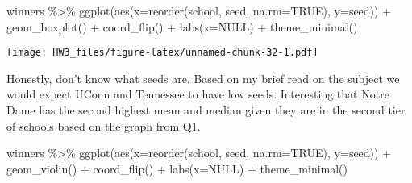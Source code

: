 \documentclass[
]{article}
\newenvironment{Shaded}{\begin{snugshade}}{\end{snugshade}}
\newcommand{\AttributeTok}[1]{\textcolor[rgb]{0.77,0.63,0.00}{#1}}
\newcommand{\ConstantTok}[1]{\textcolor[rgb]{0.00,0.00,0.00}{#1}}
\newcommand{\FunctionTok}[1]{\textcolor[rgb]{0.00,0.00,0.00}{#1}}
\newcommand{\NormalTok}[1]{#1}
\newcommand{\OtherTok}[1]{\textcolor[rgb]{0.56,0.35,0.01}{#1}}
\newcommand{\SpecialCharTok}[1]{\textcolor[rgb]{0.00,0.00,0.00}{#1}}
\begin{document}
\begin{Shaded}
\end{Shaded}

\begin{Shaded}
\begin{Highlighting}[]
\NormalTok{winners }\SpecialCharTok{\%\textgreater{}\%} \FunctionTok{ggplot}\NormalTok{(}\FunctionTok{aes}\NormalTok{(}\AttributeTok{x=}\FunctionTok{reorder}\NormalTok{(school, seed, }\AttributeTok{na.rm=}\ConstantTok{TRUE}\NormalTok{),}
                       \AttributeTok{y=}\NormalTok{seed)) }\SpecialCharTok{+}
  \FunctionTok{geom\_boxplot}\NormalTok{() }\SpecialCharTok{+}
  \FunctionTok{coord\_flip}\NormalTok{() }\SpecialCharTok{+} 
  \FunctionTok{labs}\NormalTok{(}\AttributeTok{x=}\ConstantTok{NULL}\NormalTok{) }\SpecialCharTok{+}
  \FunctionTok{theme\_minimal}\NormalTok{()}
\end{Highlighting}
\end{Shaded}

\texttt{[image: HW3\_files/figure-latex/unnamed-chunk-32-1.pdf]}

Honestly, don't know what seeds are. Based on my brief read on the
subject we would expect UConn and Tennessee to have low seeds.
Interesting that Notre Dame has the second highest mean and median given
they are in the second tier of schools based on the graph from Q1.

\begin{Shaded}
\begin{Highlighting}[]
\NormalTok{winners }\SpecialCharTok{\%\textgreater{}\%} \FunctionTok{ggplot}\NormalTok{(}\FunctionTok{aes}\NormalTok{(}\AttributeTok{x=}\FunctionTok{reorder}\NormalTok{(school, seed, }\AttributeTok{na.rm=}\ConstantTok{TRUE}\NormalTok{),}
                       \AttributeTok{y=}\NormalTok{seed)) }\SpecialCharTok{+}
  \FunctionTok{geom\_violin}\NormalTok{() }\SpecialCharTok{+}
  \FunctionTok{coord\_flip}\NormalTok{() }\SpecialCharTok{+} 
  \FunctionTok{labs}\NormalTok{(}\AttributeTok{x=}\ConstantTok{NULL}\NormalTok{) }\SpecialCharTok{+}
  \FunctionTok{theme\_minimal}\NormalTok{()}
\end{Highlighting}
\end{Shaded}
\end{document}
